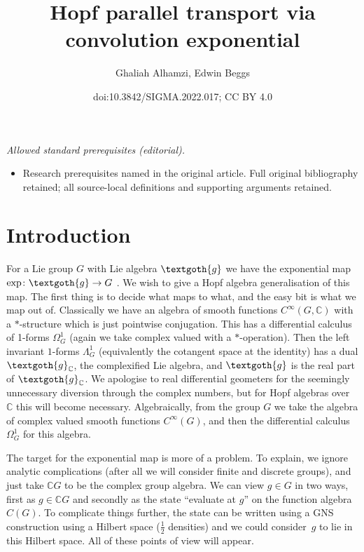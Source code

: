 \documentclass[10pt,a4paper]{amsart}
\title{Hopf parallel transport via convolution exponential}
\author{Ghaliah Alhamzi, Edwin Beggs}
\date{doi:10.3842/SIGMA.2022.017; CC BY 4.0}
\numberwithin{equation}{section}
\newcommand{\C}{\mathbb{C}}
\newcommand{\<}{\langle}
\renewcommand{\>}{\rangle}
\begin{document}
\maketitle
\noindent\textit{Allowed standard prerequisites (editorial).}\begin{itemize}
\item Research prerequisites named in the original article. Full original bibliography retained; all source-local definitions and supporting arguments retained.
\end{itemize}\medskip
\section{Introduction}
For a Lie group $ G $ with Lie algebra $ \textgoth{g} $ we have the exponential map $ \exp\colon \textgoth{g} \rightarrow G $ \cite{Hausner}. We wish to give a Hopf algebra generalisation of this map. The first thing is to decide what maps to what, and the easy bit is what we map out of. Classically we have an algebra of smooth functions $ C^{\infty } (G, \C) $ with a $ * $-structure which is just pointwise conjugation. This has a differential calculus of 1-forms $ \Omega_{G}^{1} $ (again we take complex valued with a $ * $-operation). Then the left invariant $ 1 $-forms $ \Lambda_{G}^{1} $ (equivalently the cotangent space at the identity) has a dual $ \textgoth{g} _{\C}$, the complexified Lie algebra, and $ \textgoth{g} $ is the real part of $ \textgoth{g} _{\C} $. We apologise to real differential geometers for the seemingly unnecessary diversion through the complex numbers, but for Hopf algebras over $ \C $ this will become necessary. Algebraically, from the group $ G $ we take the algebra of complex valued smooth functions $ C^{\infty}(G) $, and then the differential calculus $ \Omega_{G}^{1} $ for this algebra.

The target for the exponential map is more of a problem. To explain, we ignore analytic complications (after all we will consider finite and discrete groups), and just take $ \C G $ to be the complex group algebra. We can view $g\in G $ in two ways, first as $g\in \C G $ and secondly as the state ``evaluate at $ g $'' on the function algebra $ C (G )$. To complicate things further, the state can be written using a GNS construction using a Hilbert space ($\frac{1}{2}$ densities) and we could consider~$ g $ to lie in this Hilbert space. All of these points of view will appear.
\end{document}
